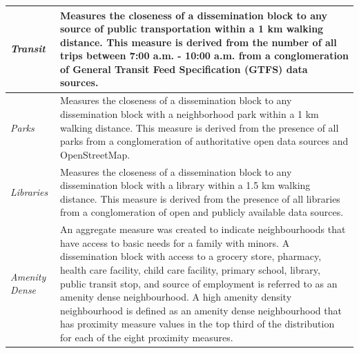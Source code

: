 \documentclass[11pt, a4paper]{article}
\begin{document}
\begin{table}[H]
{\begin{tabularx}{\textwidth}{|p{2cm}|X|}
\hline
\textit{Transit} & Measures the closeness of a dissemination block to any source of public transportation within a 1 km walking distance. This measure is derived from the number of all trips between 7:00 a.m. - 10:00 a.m. from a conglomeration of General Transit Feed Specification (GTFS) data sources. \\
\hline
\textit{Parks} & Measures the closeness of a dissemination block to any dissemination block with a neighborhood park within a 1 km walking distance. This measure is derived from the presence of all parks from a conglomeration of authoritative open data sources and OpenStreetMap. \\
\hline
\textit{Libraries} & Measures the closeness of a dissemination block to any dissemination block with a library within a 1.5 km walking distance. This measure is derived from the presence of all libraries from a conglomeration of open and publicly available data sources. \\
\hline
\textit{Amenity Dense} & An aggregate measure was created to indicate neighbourhoods that have access to basic needs for a family with minors. A dissemination block with access to a grocery store, pharmacy, health care facility, child care facility, primary school, library, public transit stop, and source of employment is referred to as an amenity dense neighbourhood. A high amenity density neighbourhood is defined as an amenity dense neighbourhood that has proximity measure values in the top third of the distribution for each of the eight proximity measures. \\
\hline
\hline
\end{tabularx}
}
\end{table}
\end{document}
